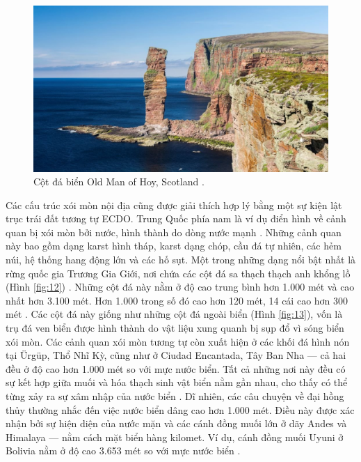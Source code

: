 \documentclass[10pt,twocolumn,letterpaper]{article}
\begin{document}
\begin{figure}[b]
\begin{center}
   \includegraphics[width=1\linewidth]{hoy.jpg}
\end{center}
   \caption{Cột đá biển Old Man of Hoy, Scotland \cite{83}.}
\label{fig:13}
\label{fig:onecol}
\end{figure}
Các cấu trúc xói mòn nội địa cũng được giải thích hợp lý bằng một sự kiện lật trục trái đất tương tự ECDO. Trung Quốc phía nam là ví dụ điển hình về cảnh quan bị xói mòn bởi nước, hình thành do dòng nước mạnh \cite{82}. Những cảnh quan này bao gồm dạng karst hình tháp, karst dạng chóp, cầu đá tự nhiên, các hẻm núi, hệ thống hang động lớn và các hố sụt. Một trong những dạng nổi bật nhất là rừng quốc gia Trương Gia Giới, nơi chứa các cột đá sa thạch thạch anh khổng lồ (Hình \ref{fig:12}) \cite{84}. Những cột đá này nằm ở độ cao trung bình hơn 1.000 mét và cao nhất hơn 3.100 mét. Hơn 1.000 trong số đó cao hơn 120 mét, 14 cái cao hơn 300 mét \cite{85}. Các cột đá này giống như những cột đá ngoài biển (Hình \ref{fig:13}), vốn là trụ đá ven biển được hình thành do vật liệu xung quanh bị sụp đổ vì sóng biển xói mòn. Các cảnh quan xói mòn tương tự còn xuất hiện ở các khối đá hình nón tại Ürgüp, Thổ Nhĩ Kỳ, cũng như ở Ciudad Encantada, Tây Ban Nha — cả hai đều ở độ cao hơn 1.000 mét so với mực nước biển. Tất cả những nơi này đều có sự kết hợp giữa muối và hóa thạch sinh vật biển nằm gần nhau, cho thấy có thể từng xảy ra sự xâm nhập của nước biển \cite{15,86,87}. Dĩ nhiên, các câu chuyện về đại hồng thủy \cite{3} thường nhắc đến việc nước biển dâng cao hơn 1.000 mét. Điều này được xác nhận bởi sự hiện diện của nước mặn và các cánh đồng muối lớn ở dãy Andes và Himalaya — nằm cách mặt biển hàng kilomet. Ví dụ, cánh đồng muối Uyuni ở Bolivia nằm ở độ cao 3.653 mét so với mực nước biển \cite{94}.
\end{document}

